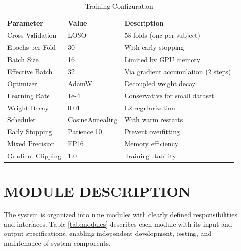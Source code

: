 \begin{table}[H]
    \centering
    \small
    \caption{Training Configuration}
    \label{tab:training_config}
    \begin{tabularx}{\textwidth}{|L{3.5cm}|L{3cm}|X|}
        \hline
        \textbf{Parameter} & \textbf{Value} & \textbf{Description} \\
        \hline
        Cross-Validation & LOSO & 58 folds (one per subject) \\
        \hline
        Epochs per Fold & 30 & With early stopping \\
        \hline
        Batch Size & 16 & Limited by GPU memory \\
        \hline
        Effective Batch & 32 & Via gradient accumulation (2 steps) \\
        \hline
        Optimizer & AdamW & Decoupled weight decay \\
        \hline
        Learning Rate & 1e-4 & Conservative for small dataset \\
        \hline
        Weight Decay & 0.01 & L2 regularization \\
        \hline
        Scheduler & CosineAnnealing & With warm restarts \\
        \hline
        Early Stopping & Patience 10 & Prevent overfitting \\
        \hline
        Mixed Precision & FP16 & Memory efficiency \\
        \hline
        Gradient Clipping & 1.0 & Training stability \\
        \hline
    \end{tabularx}
\end{table}

\section{MODULE DESCRIPTION}

The system is organized into nine modules with clearly defined responsibilities and interfaces. Table \ref{tab:modules} describes each module with its input and output specifications, enabling independent development, testing, and maintenance of system components.

